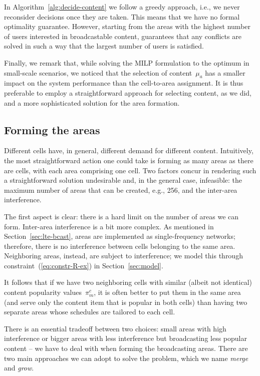 \documentclass[10pt, conference, compsocconf]{IEEEtran}
\numberwithin{equation}{section}
\begin{document}
In Algorithm~\ref{alg:decide-content} we follow a greedy approach,
i.e., we never reconsider decisions once they are taken. This means that we have no formal
optimality guarantee. However, starting from the areas with the
highest number of users interested in broadcastable content, guarantees that any conflicts
are solved in such a way that the largest number of users is satisfied.

Finally, we remark that, while solving the MILP formulation to the optimum in
small-scale scenarios, we noticed that the selection of content~$\mu_a$ has a
smaller 
impact on the system performance
than the cell-to-area assignment. It is thus preferable to employ a straightforward
approach for selecting content, as we did, and a more sophisticated solution for the
area formation.


\subsection{Forming the areas}

Different cells have, in general, different demand for different content. Intuitively,
the most straightforward action one could take is forming as many areas as there are cells, with
each area comprising one cell. Two factors concur in rendering such a straightforward
solution undesirable and, in the general case, infeasible: the maximum number of areas that can be created, e.g., 256,
and the inter-area interference.


The first aspect is clear: there is a hard limit on the number of
areas we can form.
Inter-area interference is a bit more complex. As mentioned in Section~\ref{sec:lte-bcast},
areas are implemented as single-frequency networks; therefore, there is no interference
between cells belonging to the same area. Neighboring areas, instead, are subject to
interference; we model this through constraint~(\ref{eq:constr-R-ex}) in Section~\ref{sec:model}.

It follows that if we have two neighboring cells with similar (albeit not identical)
content popularity values~$\pi^c_m$, it is often better to put them in the same area (and
serve only the content item that is popular in both cells) than having two separate areas
whose schedules are tailored to each cell.



There is an essential tradeoff between two choices: small areas with high interference
or bigger areas with less interference but broadcasting less popular content -- we have to
deal with when forming the broadcasting areas. There are two main
approaches we can adopt to solve the problem, 
which we name {\em merge} and {\em grow}.
\end{document}
